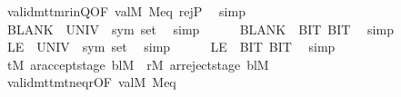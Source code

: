 \begin{isabellebody}
\ valid{\isacharunderscore}{\kern0pt}mttm{\isacharunderscore}{\kern0pt}r{\isacharunderscore}{\kern0pt}in{\isacharunderscore}{\kern0pt}Q{\isacharbrackleft}{\kern0pt}OF\ valM{\isacharbrackright}{\kern0pt}\ M{\isacharunderscore}{\kern0pt}eq\ rej{\isacharunderscore}{\kern0pt}P\ \isamarkupfalse%
\ simp\isanewline
\isanewline
\ \ \ \ %
\isanewline
\ \ \ \ \isamarkupfalse%
\ {\isachardoublequoteopen}BLANK{}\ {\isasymin}\ {\isacharparenleft}{\kern0pt}UNIV\ {\isacharcolon}{\kern0pt}{\isacharcolon}{\kern0pt}\ sym{}\ set{\isacharparenright}{\kern0pt}{\isachardoublequoteclose}\ \isamarkupfalse%
\ simp\isanewline
\ \ \ \ \isamarkupfalse%
\ {\isachardoublequoteopen}BLANK{}\ {\isasymnotin}\ {\isacharbraceleft}{\kern0pt}BIT{}{\isacharcomma}{\kern0pt}\ BIT{}{\isacharbraceright}{\kern0pt}{\isachardoublequoteclose}\ \isamarkupfalse%
\ simp\isanewline
\ \ \ \ \isamarkupfalse%
\ {\isachardoublequoteopen}LE{}\ {\isasymin}\ {\isacharparenleft}{\kern0pt}UNIV\ {\isacharcolon}{\kern0pt}{\isacharcolon}{\kern0pt}\ sym{}\ set{\isacharparenright}{\kern0pt}{\isachardoublequoteclose}\ \isamarkupfalse%
\ simp\isanewline
\ \ \ \ \isamarkupfalse%
\ {\isachardoublequoteopen}LE{}\ {\isasymnotin}\ {\isacharbraceleft}{\kern0pt}BIT{}{\isacharcomma}{\kern0pt}\ BIT{}{\isacharbraceright}{\kern0pt}{\isachardoublequoteclose}\ \isamarkupfalse%
\ simp\isanewline
\isanewline
\ \ \ \ %
\isanewline
\ \ \ \ \isamarkupfalse%
\ {\isachardoublequoteopen}{\isacharparenleft}{\kern0pt}t\isactrlsub M{\isacharcomma}{\kern0pt}\ ar{\isacharunderscore}{\kern0pt}accept{\isacharunderscore}{\kern0pt}stage\ bl\isactrlsub M{\isacharparenright}{\kern0pt}\ {\isasymnoteq}\ {\isacharparenleft}{\kern0pt}r\isactrlsub M{\isacharcomma}{\kern0pt}\ ar{\isacharunderscore}{\kern0pt}reject{\isacharunderscore}{\kern0pt}stage\ bl\isactrlsub M{\isacharparenright}{\kern0pt}{\isachardoublequoteclose}\isanewline
\ \ \ \ \ \ \isamarkupfalse%
\ valid{\isacharunderscore}{\kern0pt}mttm{\isacharunderscore}{\kern0pt}t{\isacharunderscore}{\kern0pt}neq{\isacharunderscore}{\kern0pt}r{\isacharbrackleft}{\kern0pt}OF\ valM{\isacharbrackright}{\kern0pt}\ M{\isacharunderscore}{\kern0pt}eq\ \isamarkupfalse%

\end{isabellebody}
